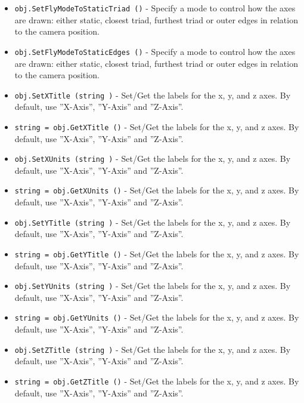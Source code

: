 \begin{itemize}
\item  \verb|obj.SetFlyModeToStaticTriad ()| -  Specify a mode to control how the axes are drawn: either static, 
 closest triad, furthest triad or outer edges in relation to the 
 camera position.

\item  \verb|obj.SetFlyModeToStaticEdges ()| -  Specify a mode to control how the axes are drawn: either static, 
 closest triad, furthest triad or outer edges in relation to the 
 camera position.

\item  \verb|obj.SetXTitle (string )| -  Set/Get the labels for the x, y, and z axes. By default, 
 use ''X-Axis'', ''Y-Axis'' and ''Z-Axis''.

\item  \verb|string = obj.GetXTitle ()| -  Set/Get the labels for the x, y, and z axes. By default, 
 use ''X-Axis'', ''Y-Axis'' and ''Z-Axis''.

\item  \verb|obj.SetXUnits (string )| -  Set/Get the labels for the x, y, and z axes. By default, 
 use ''X-Axis'', ''Y-Axis'' and ''Z-Axis''.

\item  \verb|string = obj.GetXUnits ()| -  Set/Get the labels for the x, y, and z axes. By default, 
 use ''X-Axis'', ''Y-Axis'' and ''Z-Axis''.

\item  \verb|obj.SetYTitle (string )| -  Set/Get the labels for the x, y, and z axes. By default, 
 use ''X-Axis'', ''Y-Axis'' and ''Z-Axis''.

\item  \verb|string = obj.GetYTitle ()| -  Set/Get the labels for the x, y, and z axes. By default, 
 use ''X-Axis'', ''Y-Axis'' and ''Z-Axis''.

\item  \verb|obj.SetYUnits (string )| -  Set/Get the labels for the x, y, and z axes. By default, 
 use ''X-Axis'', ''Y-Axis'' and ''Z-Axis''.

\item  \verb|string = obj.GetYUnits ()| -  Set/Get the labels for the x, y, and z axes. By default, 
 use ''X-Axis'', ''Y-Axis'' and ''Z-Axis''.

\item  \verb|obj.SetZTitle (string )| -  Set/Get the labels for the x, y, and z axes. By default, 
 use ''X-Axis'', ''Y-Axis'' and ''Z-Axis''.

\item  \verb|string = obj.GetZTitle ()| -  Set/Get the labels for the x, y, and z axes. By default, 
 use ''X-Axis'', ''Y-Axis'' and ''Z-Axis''.


\end{itemize}
